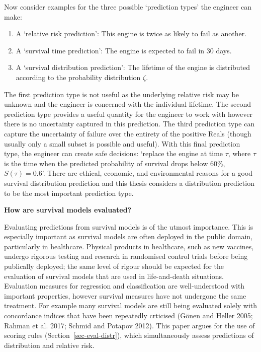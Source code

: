 \documentclass[
  letterpaper,
]{scrbook}
\providecommand{\tightlist}{%
  \setlength{\itemsep}{0pt}\setlength{\parskip}{0pt}}\usepackage{longtable,booktabs,array}
\theoremstyle{plain}
\theoremstyle{definition}
\theoremstyle{remark}
\begin{document}
Now consider examples for the three possible `prediction types' the
engineer can make:

\begin{enumerate}
\def\labelenumi{\roman{enumi}.}
\tightlist
\item
  A `relative risk prediction': This engine is twice as likely to fail
  as another.
\item
  A `survival time prediction': The engine is expected to fail in 30
  days.
\item
  A `survival distribution prediction': The lifetime of the engine is
  distributed according to the probability distribution \(\zeta\).
\end{enumerate}

The first prediction type is not useful as the underlying relative risk
may be unknown and the engineer is concerned with the individual
lifetime. The second prediction type provides a useful quantity for the
engineer to work with however there is no uncertainty captured in this
prediction. The third prediction type can capture the uncertainty of
failure over the entirety of the positive Reals (though usually only a
small subset is possible and useful). With this final prediction type,
the engineer can create safe decisions: `replace the engine at time
\(\tau\), where \(\tau\) is the time when the predicted probability of
survival drops below 60\%, \(S(\tau) = 0.6\)'. There are ethical,
economic, and environmental reasons for a good survival distribution
prediction and this thesis considers a distribution prediction to be the
most important prediction type.

\textbf{How are survival models evaluated?}

Evaluating predictions from survival models is of the utmost importance.
This is especially important as survival models are often deployed in
the public domain, particularly in healthcare. Physical products in
healthcare, such as new vaccines, undergo rigorous testing and research
in randomised control trials before being publically deployed; the same
level of rigour should be expected for the evaluation of survival models
that are used in life-and-death situations. Evaluation measures for
regression and classification are well-understood with important
properties, however survival measures have not undergone the same
treatment. For example many survival models are still being evaluated
solely with concordance indices that have been repeatedly crticised
(Gönen and Heller 2005; Rahman et al. 2017; Schmid and Potapov 2012).
This paper argues for the use of scoring rules
(Section~\ref{sec-eval-distr}), which simultaneously assess predictions
of distribution and relative risk.
\end{document}
